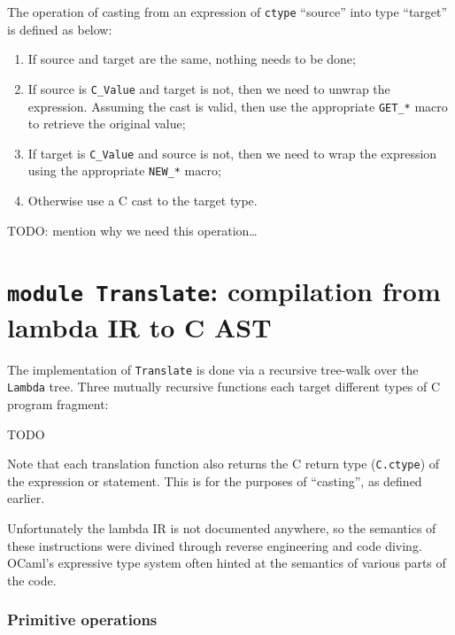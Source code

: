 \documentclass[12pt,a4paper,twoside,openright]{report}
\begin{document}
The operation of casting from an expression of \lstinline!ctype! ``source''
into type ``target'' is defined as below:

\begin{enumerate}
  \item If source and target are the same, nothing needs to be done;
  \item If source is \lstinline!C_Value! and target is not, then we need to
    unwrap the expression. Assuming the cast is valid, then use the appropriate
    \lstinline!GET_*! macro to retrieve the original value;
  \item If target is \lstinline!C_Value! and source is not, then we need to
    wrap the expression using the appropriate \lstinline!NEW_*! macro;
  \item Otherwise use a C cast to the target type.
\end{enumerate}

TODO: mention why we need this operation\dots

\section{\texttt{module Translate}: compilation from lambda IR to C AST}

The implementation of \lstinline!Translate! is done via a recursive tree-walk
over the \lstinline!Lambda! tree. Three mutually recursive functions each
target different types of C program fragment:

TODO

Note that each translation function also returns the C return type
(\lstinline!C.ctype!) of the expression or statement. This is for the purposes of ``casting'', as defined earlier.

Unfortunately the lambda IR is not documented anywhere, so the semantics
of these instructions were divined through reverse engineering and code diving.
OCaml's expressive type system often hinted at the semantics of various
parts of the code.

\subsubsection{Primitive operations}
\end{document}
